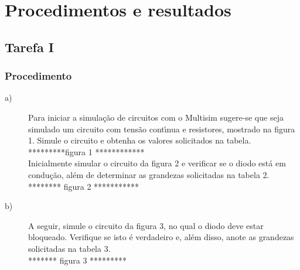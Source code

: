 \setcounter{topnumber}{5}
\setcounter{bottomnumber}{5}
\setcounter{totalnumber}{5}

\chapter{Procedimentos e resultados}

\section{Tarefa I}
\subsection{Procedimento}
\begin{description}
  \item[a)]Para iniciar a simula\c{c}\~{a}o de circuitos com o Multisim sugere-se que seja simulado um circuito com tens\~{a}o cont\'{\i}nua e resistores, mostrado na figura 1. Simule o circuito e obtenha os valores solicitados na tabela.\\

      *********figura 1 ************ \\

      Inicialmente simular o circuito da figura 2 e verificar se o diodo est\'{a} em condu\c{c}\~{a}o, al\'{e}m de determinar as grandezas solicitadas na tabela 2. \\

      ******** figura 2 *********** \\


  \item[b)]A seguir, simule o circuito da figura 3, no qual o diodo deve estar bloqueado. Verifique se isto \'{e} verdadeiro e, al\'{e}m disso, anote as grandezas solicitadas na tabela 3. \\

      ******* figura 3 ********* \\
\end{description}

